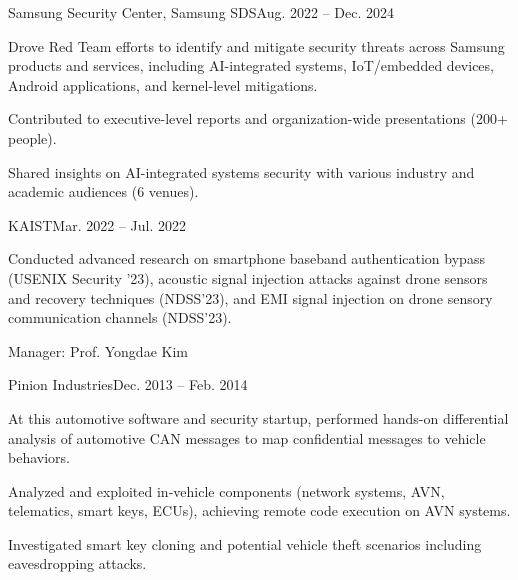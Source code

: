 \begin{timeitemize}{Samsung Security Center, Samsung SDS}{Aug. 2022 -- Dec. 2024}
    \item Drove Red Team efforts to identify and mitigate security threats across Samsung products and services, including AI-integrated systems, IoT/embedded devices, Android applications, and kernel-level mitigations.
    \item Contributed to executive-level reports and organization-wide presentations (200+ people).
    \item Shared insights on AI-integrated systems security with various industry and academic audiences (6 venues).
\end{timeitemize}

\begin{timeitemize}{KAIST}{Mar. 2022 -- Jul. 2022}
    \item Conducted advanced research on smartphone baseband authentication bypass (USENIX Security '23), acoustic signal injection attacks against drone sensors and recovery techniques (NDSS'23), and EMI signal injection on drone sensory communication channels (NDSS'23).
    \item Manager: Prof. Yongdae Kim
\end{timeitemize}

\begin{timeitemize}{Pinion Industries}{Dec. 2013 -- Feb. 2014}
    \item At this automotive software and security startup, performed hands-on differential analysis of automotive CAN messages to map confidential messages to vehicle behaviors.
    \item Analyzed and exploited in-vehicle components (network systems, AVN, telematics, smart keys, ECUs), achieving remote code execution on AVN systems.
    \item Investigated smart key cloning and potential vehicle theft scenarios including eavesdropping attacks.
\end{timeitemize}

